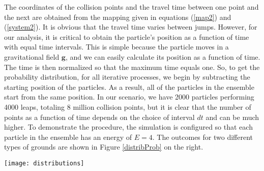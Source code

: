 \documentclass[reprint, aps, pre,nofootinbib]{revtex4-1}
\begin{document}
The coordinates of the collision points and the travel time between
one point and the next are obtained from the mapping given in equations
(\ref{map2}) and (\ref{system2}). It is obvious that the travel
time varies between jumps. However, for our analysis, it is critical
to obtain the particle's position as a function of time with equal
time intervals. This is simple because the particle moves in a gravitational
field $\boldsymbol{g}$, and we can easily calculate its position
as a function of time. The time is then normalized so that the maximum
time equals one. So, to get the probability distribution, for all
iterative processes, we begin by subtracting the starting position
of the particles. As a result, all of the particles in the ensemble
start from the same position. In our scenario, we have 2000 particles
performing 4000 leaps, totaling 8 million collision points, but it
is clear that the number of points as a function of time depends on
the choice of interval $dt$ and can be much higher. To demonstrate
the procedure, the simulation is configured so that each particle
in the ensemble has an energy of $E=4$. The outcomes for two different
types of grounds are shown in Figure \ref{distribProb} on the right.
\begin{figure*}
\begin{centering}
\texttt{[image: distributions]}
\par\end{centering}
\caption{The first graphic of each column contains time evolution examples
for the likelihood of a single particle jumping to the right. The
difference is in the $\beta$ parameter value, which is lowered to
one-tenth and one-hundredth of its initial value in the columns on
the left. The evolution of the 4-particle leaps (4 initial conditions)
is explored in the graphs. The different initial conditions for the
particles are obtained by changing the initial parameter $p$ in the
functions $x(p)$ and $y(p)$ in Eq (\ref{xyspt}) and keeping the
energy $\bar{E}=4$ constant. The selected $p$-parameters are shown
in the figures. The respective contour plots for the probability distributions
are shown on the right.}
\label{distribProb}
\end{figure*}
\end{document}
